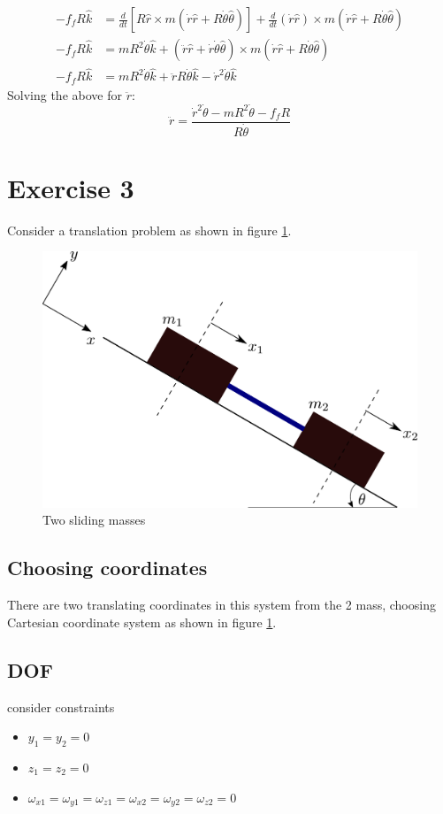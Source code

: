 \begin{align*}
	-f_{f}R \hat{k} &= \frac{d}{dt} \left[R \hat{r} \times  m \left(\dot{r}\hat{r} + R \dot{\theta} \hat{\theta}\right)\right] + \frac{d}{dt} \left(\dot{r}\hat{r}\right) \times m \left(\dot{r}\hat{r} + R \dot{\theta} \hat{\theta}\right) \\
	-f_{f}R \hat{k} &= m R^{2} \dot{\theta} \hat{k} + \left( \ddot{r}\hat{r} + \dot{r}\dot{\theta}\hat{\theta} \right) \times m \left(\dot{r}\hat{r} + R \dot{\theta} \hat{\theta}\right) \\
	-f_{f}R \hat{k} &= m R^{2} \dot{\theta} \hat{k} + \ddot{r}R\dot{\theta}\hat{k} - \dot{r}^{2}\dot{\theta} \hat{k}
\end{align*}
Solving the above for $\ddot{r}$:
\begin{equation}
	\ddot{r} = \frac{\dot{r}^{2}\dot{\theta} - m R^{2} \dot{\theta} -f_{f}R}{R\dot{\theta}}
\end{equation}


\section{Exercise 3}

Consider a translation problem as shown in figure \ref{Fig_0_ch_4_Ex3}.
\begin{figure}[h!]
	\centering
	\includegraphics[width=0.5\linewidth]{Bilder/19_TwoMassesRodProblem.pdf}
	\caption{Two sliding masses}
	\label{Fig_0_ch_4_Ex3}
\end{figure}

\subsection{Choosing coordinates}

There are two translating coordinates in this system from the 2 mass, choosing Cartesian coordinate system as shown in figure \ref{Fig_0_ch_4_Ex3}.

\subsection{DOF}
consider constraints
\begin{itemize}
	\item $y_{1} = y_{2} = 0$
	\item $z_{1} = z_{2} = 0$
	\item $\omega_{x1} = \omega_{y1} = \omega_{z1} = \omega_{x2} = \omega_{y2} = \omega_{z2} = 0$
\end{itemize} 

